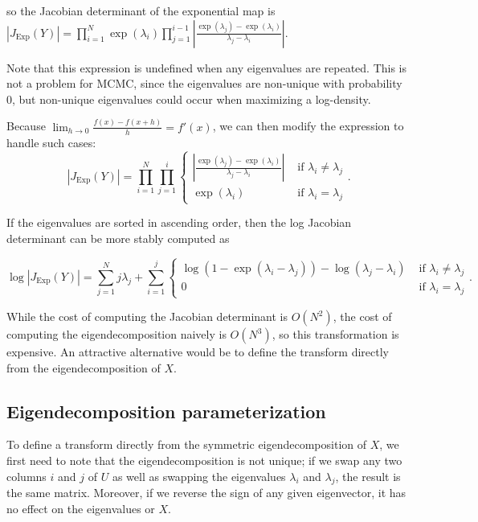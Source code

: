 \documentclass[11pt]{article}
\newcommand{\abs}[1]{\left| #1 \right|}
\newcommand{\absdet}[1]{\abs{#1}}
\newcommand{\Exp}{\mathrm{Exp}}
\begin{document}
so the Jacobian determinant of the exponential map is $\absdet{J_{\Exp}(Y)} = \prod_{i=1}^N \exp(\lambda_i) \prod_{j=1}^{i-1} \left|\frac{\exp(\lambda_j) - \exp(\lambda_i)}{\lambda_j - \lambda_i}\right|$.

Note that this expression is undefined when any eigenvalues are repeated.
This is not a problem for MCMC, since the eigenvalues are non-unique with probability 0, but non-unique eigenvalues could occur when maximizing a log-density.

Because $\lim_{h \to 0} \frac{f(x) - f(x + h)}{h} = f'(x)$, we can then modify the expression to handle such cases:
\[
  \absdet{J_{\Exp}(Y)} = \prod_{i=1}^N \prod_{j=1}^i \begin{cases}
    \left|\frac{\exp(\lambda_j) - \exp(\lambda_i)}{\lambda_j - \lambda_i}\right| &\text{ if } \lambda_i \ne \lambda_j \\ 
    \exp(\lambda_i) &\text{ if } \lambda_i = \lambda_j
  \end{cases}.
\]

If the eigenvalues are sorted in ascending order, then the log Jacobian determinant can be more stably computed as 

\[
  \log\absdet{J_{\Exp}(Y)} = \sum_{j=1}^N j\lambda_j + \sum_{i=1}^j \begin{cases}
    \log(1 - \exp(\lambda_i - \lambda_j)) - \log(\lambda_j - \lambda_i) &\text{ if } \lambda_i \ne \lambda_j \\ 
    0 &\text{ if } \lambda_i = \lambda_j
  \end{cases}.
\]

While the cost of computing the Jacobian determinant is $O(N^2)$, the cost of computing the eigendecomposition naively is $O(N^3)$, so this transformation is expensive.
An attractive alternative would be to define the transform directly from the eigendecomposition of $X$.

\subsection{Eigendecomposition parameterization}

To define a transform directly from the symmetric eigendecomposition of $X$, we first need to note that the eigendecomposition is not unique; if we swap any two columns $i$ and $j$ of $U$ as well as swapping the eigenvalues $\lambda_i$ and $\lambda_j$, the result is the same matrix.
Moreover, if we reverse the sign of any given eigenvector, it has no effect on the eigenvalues or $X$.
\end{document}
